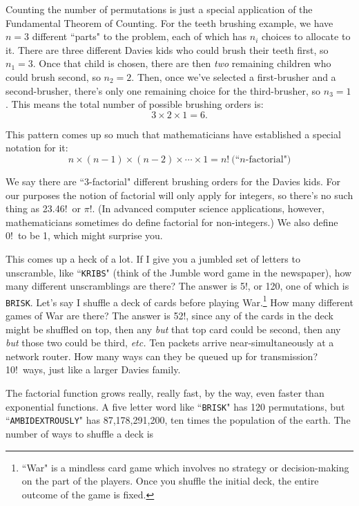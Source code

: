 Counting the number of permutations is just a special application of the
Fundamental Theorem of Counting. For the teeth brushing example, we have
$n=3$ different ``parts" to the problem, each of which has $n_i$ choices to
allocate to it. There are three different Davies kids who could brush their
teeth first, so $n_1=3$. Once that child is chosen, there are then
\textit{two} remaining children who could brush second, so $n_2=2$. Then,
once we've selected a first-brusher and a second-brusher, there's only one
remaining choice for the third-brusher, so $n_3=1$. This means the total
number of possible brushing orders is:
\[
3 \times 2 \times 1 = 6.
\]

This pattern comes up so much that mathematicians have established a
special notation for it:
\[
n \times (n-1) \times (n-2) \times \cdots \times 1 = n!\
\text{(``$n$-factorial")}
\]

We say there are ``3-factorial" different brushing orders for the Davies
kids. For our purposes the notion of factorial will only apply for
integers, so there's no such thing as 23.46!~or $\pi$!. (In advanced
computer science applications, however, mathematicians sometimes do define
factorial for non-integers.) We also define 0!~to be 1, which might
surprise you.

This comes up a heck of a lot. If I give you a jumbled set of letters to
unscramble, like ``\texttt{KRIBS}" (think of the
Jumble\textsuperscript{\textregistered} word game in the newspaper), how
many different unscramblings are there? The answer is 5!, or 120, one of
which is \texttt{BRISK}. Let's say I shuffle a deck of cards before playing
War.\footnote{``War" is a mindless card game which involves no strategy or
decision-making on the part of the players. Once you shuffle the initial
deck, the entire outcome of the game is fixed.} How many different games of
War are there? The answer is 52!, since any of the cards in the deck might
be shuffled on top, then any \textit{but} that top card could be second,
then any \textit{but} those two could be third, \textit{etc.} Ten packets
arrive near-simultaneously at a network router.  How many ways can they be
queued up for transmission? 10!~ways, just like a larger Davies family.

The factorial function grows really, really fast, by the way, even faster
than exponential functions. A five letter word like ``\texttt{BRISK}" has
120 permutations, but ``\texttt{AMBIDEXTROUSLY}" has 87,178,291,200, ten
times the population of the earth. The number of ways to shuffle a deck is

